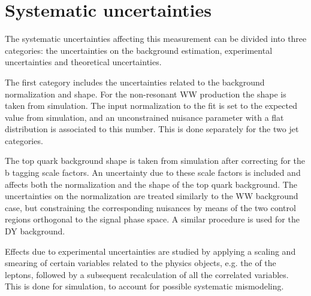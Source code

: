 \section{Systematic uncertainties}\label{chap5:systs}

The systematic uncertainties affecting this measurement can be divided into three categories: the uncertainties on the background estimation, experimental uncertainties and theoretical uncertainties.

The first category includes the uncertainties related to the background normalization and shape. For the non-resonant WW production the shape is taken from simulation. The input normalization to the fit is set to the expected value from simulation, and an unconstrained nuisance parameter with a flat distribution is associated to this number. This is done separately for the two jet categories.

The top quark background shape is taken from simulation after correcting for the b tagging scale factors. An uncertainty due to these scale factors is included and affects both the normalization and the shape of the top quark background. The uncertainties on the normalization are treated similarly to the WW background case, but constraining the corresponding nuisances by means of the two control regions orthogonal to the signal phase space. A similar procedure is used for the DY background.

Effects due to experimental uncertainties are studied by applying a scaling and smearing of
certain variables related to the physics objects, e.g. the \pt of the leptons, followed by a subsequent recalculation of all the correlated variables. This is done for simulation, to account for possible systematic mismodeling.

